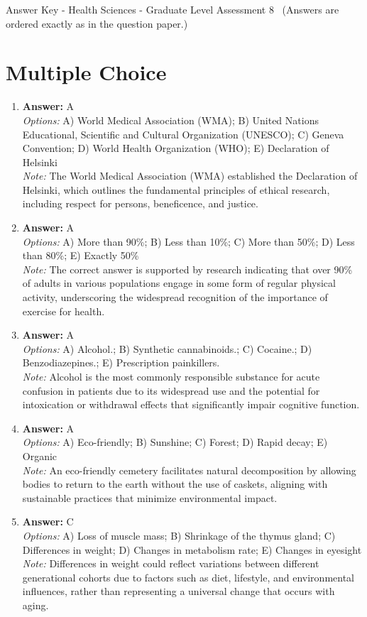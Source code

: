 \documentclass[12pt]{article}
\begin{document}
\begin{center}
Answer Key - Health Sciences - Graduate Level Assessment 8 \
\small (Answers are ordered exactly as in the question paper.)
\end{center}

\section*{Multiple Choice}
\begin{enumerate}[label=\arabic*.]
\item \textbf{Answer:} A
\\ \textit{Options:} A) World Medical Association (WMA); B) United Nations Educational, Scientific and Cultural Organization (UNESCO); C) Geneva Convention; D) World Health Organization (WHO); E) Declaration of Helsinki
\\ \textit{Note:} The World Medical Association (WMA) established the Declaration of Helsinki, which outlines the fundamental principles of ethical research, including respect for persons, beneficence, and justice.
\item \textbf{Answer:} A
\\ \textit{Options:} A) More than 90\%; B) Less than 10\%; C) More than 50\%; D) Less than 80\%; E) Exactly 50\%
\\ \textit{Note:} The correct answer is supported by research indicating that over 90\% of adults in various populations engage in some form of regular physical activity, underscoring the widespread recognition of the importance of exercise for health.
\item \textbf{Answer:} A
\\ \textit{Options:} A) Alcohol.; B) Synthetic cannabinoids.; C) Cocaine.; D) Benzodiazepines.; E) Prescription painkillers.
\\ \textit{Note:} Alcohol is the most commonly responsible substance for acute confusion in patients due to its widespread use and the potential for intoxication or withdrawal effects that significantly impair cognitive function.
\item \textbf{Answer:} A
\\ \textit{Options:} A) Eco-friendly; B) Sunshine; C) Forest; D) Rapid decay; E) Organic
\\ \textit{Note:} An eco-friendly cemetery facilitates natural decomposition by allowing bodies to return to the earth without the use of caskets, aligning with sustainable practices that minimize environmental impact.
\item \textbf{Answer:} C
\\ \textit{Options:} A) Loss of muscle mass; B) Shrinkage of the thymus gland; C) Differences in weight; D) Changes in metabolism rate; E) Changes in eyesight
\\ \textit{Note:} Differences in weight could reflect variations between different generational cohorts due to factors such as diet, lifestyle, and environmental influences, rather than representing a universal change that occurs with aging.
\end{enumerate}
\end{document}
